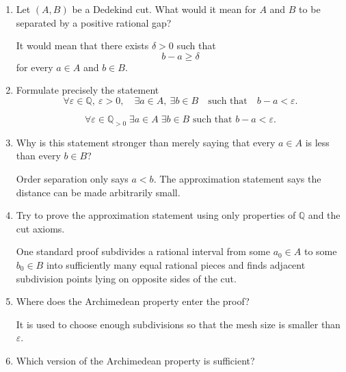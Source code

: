 \documentclass{self-check}
\begin{document}
\begin{enumerate}[label=\arabic*., itemsep=10pt]

\item Let $(A,B)$ be a Dedekind cut.
What would it mean for $A$ and $B$ to be separated by a positive rational gap?

\begin{answer}
It would mean that there exists $\delta>0$ such that
\[
b-a\ge\delta
\]
for every $a\in A$ and $b\in B$.
\end{answer}

\item Formulate precisely the statement
\[
\forall\varepsilon\in\mathbb{Q},\ \varepsilon>0,
\quad
\exists a\in A,\ \exists b\in B
\quad\text{such that}\quad
b-a<\varepsilon.
\]

\begin{answer}
\[
\forall\varepsilon\in\mathbb{Q}_{>0}\;
\exists a\in A\;\exists b\in B
\text{ such that }b-a<\varepsilon.
\]
\end{answer}

\item Why is this statement stronger than merely saying that every $a\in A$ is less than every $b\in B$?

\begin{answer}
Order separation only says $a<b$. The approximation statement says the distance can be made arbitrarily small.
\end{answer}

\item Try to prove the approximation statement using only properties of $\mathbb{Q}$ and the cut axioms.

\begin{answer}
One standard proof subdivides a rational interval from some $a_0\in A$ to some $b_0\in B$ into sufficiently many equal rational pieces and finds adjacent subdivision points lying on opposite sides of the cut.
\end{answer}

\item Where does the Archimedean property enter the proof?

\begin{answer}
It is used to choose enough subdivisions so that the mesh size is smaller than $\varepsilon$.
\end{answer}

\item Which version of the Archimedean property is sufficient?


\end{enumerate}
\end{document}
